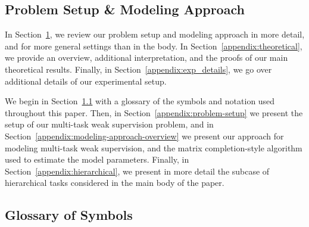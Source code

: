 \documentclass[letterpaper]{article}
\begin{document}
\pagebreak
\begin{appendix}
\section{Problem Setup \& Modeling Approach}
  \label{appendix:setup-and-model}
  \allowdisplaybreaks


In Section~\ref{appendix:setup-and-model}, we review our problem setup and modeling approach in more detail, and for more general settings than in the body.
In Section~\ref{appendix:theoretical}, we provide an overview, additional interpretation, and the proofs of our main theoretical results.
Finally, in Section~\ref{appendix:exp_details}, we go over additional details of our experimental setup.

We begin in Section~\ref{appendix:glossary} with a glossary of the symbols and notation used throughout this paper.
Then, in Section~\ref{appendix:problem-setup} we present the setup of our multi-task weak supervision problem, and in Section~\ref{appendix:modeling-approach-overview} we present our approach for modeling multi-task weak supervision, and the matrix completion-style algorithm used to estimate the model parameters.
Finally, in Section~\ref{appendix:hierarchical}, we present in more detail the subcase of hierarchical tasks considered in the main body of the paper.

\subsection{Glossary of Symbols}
\label{appendix:glossary}


\end{appendix}
\end{document}

